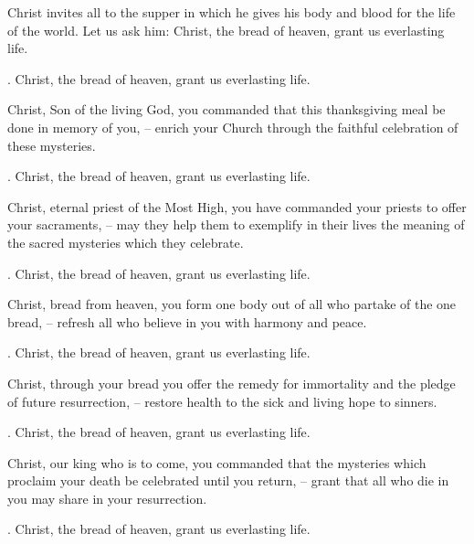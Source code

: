 \lettrine[lines=2]{C}{}hrist invites all to the supper in which he gives his body and blood for the life of the world. Let us ask him: Christ, the bread of heaven, grant us everlasting life.
\par \Rbar. Christ, the bread of heaven, grant us everlasting life.

Christ, Son of the living God, you commanded that this thanksgiving meal be done in memory of you,
– enrich your Church through the faithful celebration of these mysteries.
\par \Rbar. Christ, the bread of heaven, grant us everlasting life.

Christ, eternal priest of the Most High, you have commanded your priests to offer your sacraments,
– may they help them to exemplify in their lives the meaning of the sacred mysteries which they celebrate.
\par \Rbar. Christ, the bread of heaven, grant us everlasting life.

Christ, bread from heaven, you form one body out of all who partake of the one bread,
– refresh all who believe in you with harmony and peace.
\par \Rbar. Christ, the bread of heaven, grant us everlasting life.

Christ, through your bread you offer the remedy for immortality and the pledge of future resurrection,
– restore health to the sick and living hope to sinners.
\par \Rbar. Christ, the bread of heaven, grant us everlasting life.

Christ, our king who is to come, you commanded that the mysteries which proclaim your death be celebrated until you return,
– grant that all who die in you may share in your resurrection.
\par \Rbar. Christ, the bread of heaven, grant us everlasting life.
